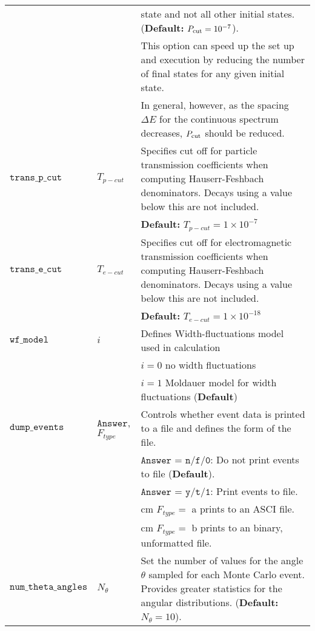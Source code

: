 \documentclass[
10pt,
showpacs,preprintnumbers,footinbib,
amsfonts,amsmath,amssymb,
aps,
prc,twocolumn,groupedaddress,superscriptaddress,
showkeys,
nofootinbib
]{revtex4-1}
\begin{document}
\begin{center}
\begin{tabular}{| p{4cm} | p{4cm} | p{9cm} |}
 & &    state and not all other initial states. ({\bf Default:} $P_{\rm cut} = 10^{-7}$).\\
 & & This option can speed up the set up and execution by reducing the number of final states for any given initial state.\\
 & & In general, however, as the spacing $\Delta E$ for the continuous spectrum decreases, $P_{\rm cut}$ should be reduced.\\
\hline
${\texttt{trans\_p\_cut}}$ & $T_{p-cut}$ & Specifies cut off for particle transmission coefficients when computing Hauserr-Feshbach denominators. Decays using a value below this are not included.\\
& & {\bf Default:} $T_{p-cut} = 1\times 10^{-7}$\\
\hline
${\texttt{trans\_e\_cut}}$ & $T_{e-cut}$ & Specifies cut off for electromagnetic transmission coefficients when computing Hauserr-Feshbach denominators. Decays using a value below this are not included.\\
& & {\bf Default:} $T_{e-cut} = 1\times 10^{-18}$\\
\hline
${\texttt{wf\_model}}$  & $i$ &    Defines Width-fluctuations model used in calculation \\
& &    $i = 0$ no width fluctuations\\
& &    $i = 1$ Moldauer model for width fluctuations ({\bf Default})\\
\hline
${\texttt{dump\_events}}$ & ${\texttt{Answer}}$, $F_{type}$ & Controls whether event data is printed to a file and defines the form of the file.\\
& & ${\texttt{Answer}}$ = ${\texttt{n/f/0}}$: Do not print events to file ({\bf Default}).\\
& & ${\texttt{Answer}}$ = ${\texttt{y/t/1}}$: Print events to file.\\
& & \hskip 1.2 cm $F_{type} =$ a prints to an ASCI file.\\
& & \hskip 1.2 cm $F_{type} =$ b prints to an binary, unformatted file.\\
\hline
${\texttt{num\_theta\_angles}}$  & $N_\theta$ &   Set the number of values for the angle $\theta$ sampled for each Monte Carlo event. Provides greater statistics for the angular distributions. ({\bf Default:} $N_\theta = 10$).\\
\hline
\end{tabular}
\end{center}
\end{document}
